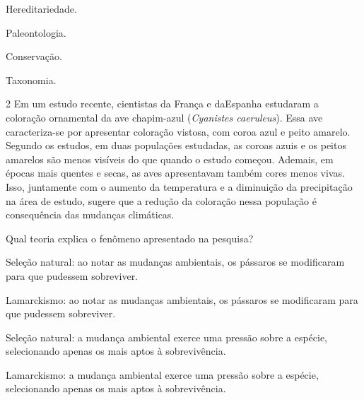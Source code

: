 \begin{escolha}
\item
  Hereditariedade.
\item
  Paleontologia.
\item
  Conservação.
\item
  Taxonomia.
\end{escolha}


\num{2}  Em um estudo recente, cientistas da França e daEspanha estudaram a
  coloração ornamental da ave chapim-azul (\emph{Cyanistes caeruleus}).
 Essa ave caracteriza-se por apresentar coloração vistosa, com coroa azul e peito amarelo.
Segundo os estudos, em duas populações estudadas, as coroas azuis e os peitos amarelos
  são menos visíveis do que quando o estudo começou. Ademais, em épocas mais quentes e secas, as aves apresentavam também cores menos
  vivas. Isso, juntamente com o aumento da
  temperatura e a diminuição da precipitação na área de estudo, sugere que
  a redução da coloração nessa população é consequência das mudanças climáticas.


Qual teoria explica o fenômeno apresentado na pesquisa?

\begin{escolha}
\item
  Seleção natural: ao notar as mudanças ambientais, os pássaros se
  modificaram para que pudessem sobreviver.
\item
  Lamarckismo: ao notar as mudanças ambientais, os pássaros se
  modificaram para que pudessem sobreviver.
\item
  Seleção natural: a mudança ambiental exerce uma pressão sobre a
  espécie, selecionando apenas os mais aptos à sobrevivência.
\item
  Lamarckismo: a mudança ambiental exerce uma pressão sobre a espécie,
  selecionando apenas os mais aptos à sobrevivência.
\end{escolha}

